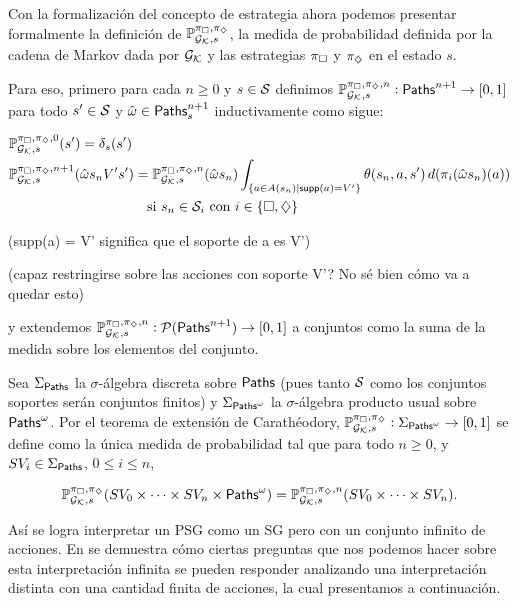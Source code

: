 \begin{boxamarillo}{}
	Con la formalización del concepto de estrategia ahora podemos presentar
	formalmente la definición de $\mathbb{P}_{\mathcal{G}_{\mathcal{K}}, s}^{\pi_\square, \pi_\diamondsuit}$, la medida de probabilidad definida por
	la cadena de Markov dada por $\mathcal{G}_{\mathcal{K}}$ y las estrategias $\pi_\square$ y $\pi_\diamondsuit$ en el estado $s$.

	Para eso, primero para cada $n \geq 0$ y $s \in \mathcal{S}$ definimos $\mathbb{P}^{\pi_\square,
			\pi_\diamondsuit, n}_{\mathcal{G}_{\mathcal{K}}, s} : \textsf{Paths}^{n+1} \rightarrow [0, 1]$ para todo $s' \in \mathcal{S}$
	y $\hat{\omega} \in \textsf{Paths}_s^{n+1}$ inductivamente como sigue:

	\begin{align*}
		&\mathbb{P}^{\pi_\square, \pi_\diamondsuit, 0}_{\mathcal{G}_{\mathcal{K}}, s}(s') = \delta_s(s') \\
		&\mathbb{P}^{\pi_\square, \pi_\diamondsuit, n+1}_{\mathcal{G}_{\mathcal{K}}, s}(\hat{\omega}s_nV's') = \mathbb{P}^{\pi_\square, \pi_\diamondsuit, n}_{\mathcal{G}_{\mathcal{K}}, s}(\hat{\omega} s_n) \int_{\{ a \in A(s_n) \mid \textsf{supp}(a) = V'\}} \theta(s_n, a, s') \, d(\pi_i(\hat{\omega}s_n)(a)) \\ & \qquad \qquad \qquad \qquad \qquad \text{si } s_n \in \mathcal{S}_i \text{ con } i \in \{\square, \diamondsuit\}
	\end{align*}

	(supp(a) = V' significa que el soporte de a es V')

	(capaz restringirse sobre las acciones con soporte V'? No sé bien cómo va a quedar esto)

	y extendemos \( \mathbb{P}^{\pi_\square, \pi_\diamondsuit, n}_{\mathcal{G}_{\mathcal{K}}, s} :
	\mathcal{P}(\textsf{Paths}^{n+1}) \to [0, 1] \) a conjuntos como la suma de la medida
	sobre los elementos del conjunto.

	Sea \( \Sigma_{\textsf{Paths}} \) la \( \sigma \)-álgebra discreta sobre \( \textsf{Paths} \)
	(pues tanto $\mathcal{S}$ como los conjuntos soportes serán conjuntos finitos) y \(
	\Sigma_{\textsf{Paths}^\omega} \) la \( \sigma \)-álgebra producto usual sobre \(
	\textsf{Paths}^\omega \). Por el teorema de extensión de Carathéodory, \(
	\mathbb{P}^{\pi_\square, \pi_\diamondsuit}_{\mathcal{G}_{\mathcal{K}}, s} : \Sigma_{\textsf{Paths}^\omega} \to [0, 1] \) se
	define como la única medida de probabilidad tal que para todo \( n \geq 0 \), y
	\( SV_i \in \Sigma_{\textsf{Paths}} \), \( 0 \leq i \leq n \),

	\[
		\mathbb{P}^{\pi_\square, \pi_\diamondsuit}_{\mathcal{G}_{\mathcal{K}}, s}(SV_0 \times \dots \times SV_n \times \textsf{Paths}^\omega) = \mathbb{P}^{\pi_\square, \pi_\diamondsuit, n}_{\mathcal{G}_{\mathcal{K}}, s}(SV_0 \times \dots \times SV_n).
	\]
\end{boxamarillo}

Así se logra interpretar un PSG como un SG pero con un conjunto infinito de
acciones. 
En \cite{Polytopal} se demuestra cómo ciertas preguntas que nos podemos hacer
sobre esta interpretación infinita se pueden responder analizando una
interpretación distinta con una cantidad finita de acciones, la cual
presentamos a continuación.

